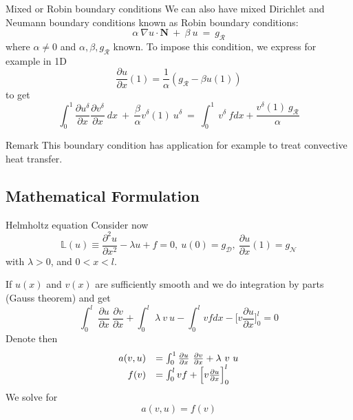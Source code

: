 \begin{frame}{Mixed or Robin boundary conditions}
  We can also have mixed Dirichlet and Neumann boundary conditions known as Robin boundary conditions:
  \begin{equation}
    \label{eq:17}
    \alpha\ \nabla u \cdot \mathbf{N }\ +\ \beta\ u\ =\ g_{\mathcal{R}}
  \end{equation}
  where $\alpha \neq 0$ and $\alpha, \beta, g_{\mathcal{R}}$ known.
  To impose this condition, we express for example in 1D
  \begin{equation}
    \label{eq:18}
    \frac{\partial u}{\partial x}(1) = \frac{1}{\alpha}( g_{\mathcal{R}} - \beta u(1) )
  \end{equation}
  to get 
  \begin{equation}
    \label{eq:19}
    \int_0^1 \frac{\partial u^{\delta}}{\partial x}\frac{\partial v^{\delta}}{\partial x}\ dx\ +\ \frac{\beta}{\alpha} v^{\delta}(1)\ u^{\delta}\ =\  \int_0^1\ v^{\delta}\ f dx + \frac{v^{\delta}(1)\ g_{\mathcal{R}}}{\alpha}
  \end{equation}

  \begin{block}{Remark}
    This boundary condition has application for example to treat
    convective heat transfer.
  \end{block}
\end{frame}

\subsection{Mathematical Formulation}
\label{sec:math-form}

\begin{frame}{Helmholtz equation}
  Consider now
  \begin{equation}
    \label{eq:15}
    \mathbb{L}(u) \equiv \frac{\partial^2 u}{\partial x^2} - \lambda u + f = 0,\ u(0) = g_{\mathcal{D}},\ \frac{\partial u}{\partial x}(1) = g_{\mathcal{N}}
  \end{equation}
  with $\lambda > 0$, and $0 < x < l$.
  
  If $u(x)$ and $v(x)$ are sufficiently smooth and we do integration by parts (Gauss theorem) and get
  \begin{equation}
    \label{eq:20}
    \int_0^l\ \frac{\partial u}{\partial x}\ \frac{\partial v}{\partial x} + \int_0^l\ \lambda\ v\ u - \int_0^l v f dx - \Big[ v\frac{\partial u}{\partial x}\Big]_0^l = 0
  \end{equation}
  Denote then
  \begin{equation}
    \label{eq:21}
    \begin{array}[c]{rl}
      a(v, u) &= \int_0^1 \frac{\partial u}{\partial x}\ \frac{\partial v}{\partial x} + \lambda\ v\ u\\
      f(v) &= \int_0^l vf + \Big[ v\frac{\partial u}{\partial x}\Big]_0^l 
    \end{array}
  \end{equation}
  We solve for
  \begin{equation}
    \label{eq:22}
    a(v,u) = f(v)
  \end{equation}
\end{frame}

